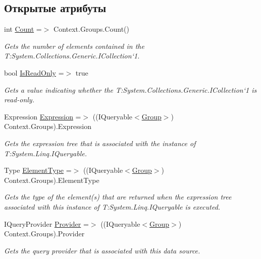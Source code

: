 \subsection*{Открытые атрибуты}
\begin{DoxyCompactItemize}
\item 
int \hyperlink{class_security_1_1_entity_framework_1_1_collections_1_1_group_collection_a6f608f1fb48b2715d1cdd4189b2d70ba}{Count} =$>$ Context.\+Groups.\+Count()
\begin{DoxyCompactList}\small\item\em Gets the number of elements contained in the T\+:\+System.\+Collections.\+Generic.\+I\+Collection`1. \end{DoxyCompactList}\item 
bool \hyperlink{class_security_1_1_entity_framework_1_1_collections_1_1_group_collection_a802e9753a71a089274964309c7417d4e}{Is\+Read\+Only} =$>$ true
\begin{DoxyCompactList}\small\item\em Gets a value indicating whether the T\+:\+System.\+Collections.\+Generic.\+I\+Collection`1 is read-\/only. \end{DoxyCompactList}\item 
Expression \hyperlink{class_security_1_1_entity_framework_1_1_collections_1_1_group_collection_adb3b54e01175990f3978e7ded1cfc696}{Expression} =$>$ ((I\+Queryable$<$\hyperlink{class_security_1_1_model_1_1_group}{Group}$>$) Context.\+Groups).Expression
\begin{DoxyCompactList}\small\item\em Gets the expression tree that is associated with the instance of T\+:\+System.\+Linq.\+I\+Queryable. \end{DoxyCompactList}\item 
Type \hyperlink{class_security_1_1_entity_framework_1_1_collections_1_1_group_collection_af39e0927aed5c4a50267344124ab858f}{Element\+Type} =$>$ ((I\+Queryable$<$\hyperlink{class_security_1_1_model_1_1_group}{Group}$>$) Context.\+Groups).Element\+Type
\begin{DoxyCompactList}\small\item\em Gets the type of the element(s) that are returned when the expression tree associated with this instance of T\+:\+System.\+Linq.\+I\+Queryable is executed. \end{DoxyCompactList}\item 
I\+Query\+Provider \hyperlink{class_security_1_1_entity_framework_1_1_collections_1_1_group_collection_a646874bfcb709c7017284f1e97a69088}{Provider} =$>$ ((I\+Queryable$<$\hyperlink{class_security_1_1_model_1_1_group}{Group}$>$) Context.\+Groups).Provider
\begin{DoxyCompactList}\small\item\em Gets the query provider that is associated with this data source. \end{DoxyCompactList}\end{DoxyCompactItemize}
